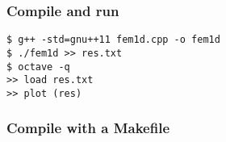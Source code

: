\documentclass[smaller,a4paper]{beamer}
\begin{document}
\begin{frame}[fragile]
\frametitle{Compile and run}
\begin{verbatim}
$ g++ -std=gnu++11 fem1d.cpp -o fem1d
$ ./fem1d >> res.txt
$ octave -q
>> load res.txt
>> plot (res)
\end{verbatim}
\end{frame}

\begin{frame}
\frametitle{Compile with a Makefile}

\end{frame}
\end{document}
